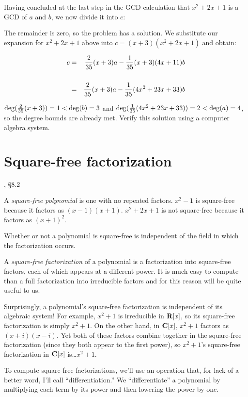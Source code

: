 Having concluded at the last step in the GCD calculation that
$x^2+2x+1$ is a GCD of $a$ and $b$, we now divide it into $c$:



The remainder is zero, so the problem has a solution.
We substitute our expansion for $x^2+2x+1$ above into $c=(x+3)(x^2+2x+1)$
and obtain:

\begin{eqnarray*}
c &=& {2\over35}(x+3)a - {1\over35}(x+3)(4x+11)b \cr\cr
  &=& {2\over35}(x+3)a - {1\over35}(4x^2+23x+33)b \cr
\end{eqnarray*}

$\deg({2\over35}(x+3)) = 1 < \deg(b) = 3$ and $\deg({1\over35}(4x^2+23x+33))
= 2 < \deg(a) = 4$, so the degree bounds are already met.
Verify this solution using a computer algebra system.

\vfill\eject


\section{Square-free factorization}

\hbox{}\qquad [Geddes], \S 8.2

A {\it square-free polynomial} is one with no repeated factors.
$x^2-1$ is square-free because it factors as $(x-1)(x+1)$.  $x^2+2x+1$
is not square-free because it factors as $(x+1)^2$.

Whether or not a polynomial is square-free is independent of the field
in which the factorization occurs.

A {\it square-free factorization} of a polynomial is a factorization
into square-free factors, each of which appears at a different power.
It is much easy to compute than a full factorization into irreducible
factors and for this reason will be quite useful to us.

Surprisingly, a polynomial's square-free factorization is independent
of its algebraic system!  For example, $x^2+1$ is irreducible in ${\bf
R}[x]$, so its square-free factorization is simply $x^2+1$.  On the
other hand, in ${\bf C}[x]$, $x^2+1$ factors as $(x+i)(x-i)$.  Yet
both of these factors combine together in the square-free
factorization (since they both appear to the first power), so
$x^2+1$'s square-free factorization in ${\bf C}[x]$ is\ldots $x^2+1$.

To compute square-free factorizations, we'll use an operation that,
for lack of a better word, I'll call ``differentiation.''  We
``differentiate'' a polynomial by multiplying each term by its power
and then lowering the power by one.

